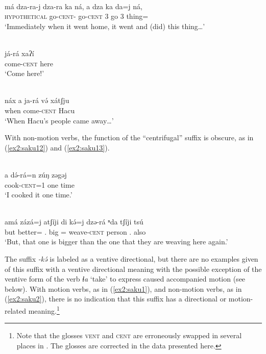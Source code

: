 \ea\label{ex2:saku9}
 \\
\gll má	dza-ra-j	dza-ra	ka	ná,	a	dza	ka	da=j	ná, \\
\textsc{hypothetical}	go-\textsc{cent}-	go-\textsc{cent}	3			go	3	thing=	 \\
\glt `Immediately when it went home, it went and (did) this thing…'

\ex\label{ex2:saku10}
 \\
\gll já-rá	xaʔí \\
come-\textsc{cent}	here \\
\glt `Come here!'

\ex\label{ex2:saku11}
 \\
\gll  náx	a	ja-rá	və́	xátʃju	 \\
when		come-\textsc{cent}		Hacu \\
\glt `When Hacu’s people came away…'
\z 

With non-motion verbs, the function of the ``centrifugal'' suffix is obscure, as in (\ref{ex2:saku12}) and (\ref{ex2:saku13}). 

\ea\label{ex2:saku12}
 \\
\gll a	də́-rá=n	zúŋ	zəgəj	\\
	cook-\textsc{cent}=1	one	time \\		
\glt `I cooked it one time.'

\ex\label{ex2:saku13}
 \\
\gll  amá zázá=j atʃíji di kə́=j dzə-rá ⁿda tʃíji tsú	\\ 
but better= . big = weave-\textsc{cent} person . also		\\
\glt `But, that one is bigger than the one that they are weaving here again.'
\z 

The suffix \textit{-kə́} is labeled as a ventive directional, but there are no examples given of this suffix with a ventive directional meaning with the possible exception of the ventive form of the verb \textit{ɬa} `take' to express caused accompanied motion (see below). With motion verbs, as in (\ref{ex2:saku1}), and non-motion verbs, as in (\ref{ex2:saku2}), there is no indication that this suffix has a directional or motion-related meaning.\footnote{Note that the glosses \textsc{vent} and \textsc{cent} are erroneously swapped in several places in \citet{thomasGrammarSakunSukur2014}. The glosses are corrected in the data presented here.} 

